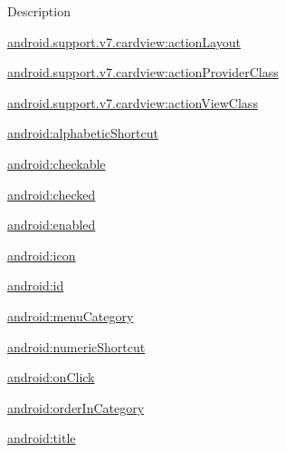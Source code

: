 Description 

{\ttfamily \hyperlink{classandroid_1_1support_1_1v7_1_1cardview_1_1R_1_1styleable_afc66347211033a94261991c2716632bc}{android.\+support.\+v7.\+cardview\+:action\+Layout}}

{\ttfamily \hyperlink{classandroid_1_1support_1_1v7_1_1cardview_1_1R_1_1styleable_a2fcf53a7e48550c4f268ac01853a1655}{android.\+support.\+v7.\+cardview\+:action\+Provider\+Class}}

{\ttfamily \hyperlink{classandroid_1_1support_1_1v7_1_1cardview_1_1R_1_1styleable_a68225a0f12a88cf1ba29787d1c3653f7}{android.\+support.\+v7.\+cardview\+:action\+View\+Class}}

{\ttfamily \hyperlink{classandroid_1_1support_1_1v7_1_1cardview_1_1R_1_1styleable_a0b91d93cd360e9465c306a85707eb4ac}{android\+:alphabetic\+Shortcut}}

{\ttfamily \hyperlink{classandroid_1_1support_1_1v7_1_1cardview_1_1R_1_1styleable_a1ab1fd5f17ea58611817a12d2ef3713b}{android\+:checkable}}

{\ttfamily \hyperlink{classandroid_1_1support_1_1v7_1_1cardview_1_1R_1_1styleable_a4ffc529c71f2f0638450bac64fa53cfc}{android\+:checked}}

{\ttfamily \hyperlink{classandroid_1_1support_1_1v7_1_1cardview_1_1R_1_1styleable_a74813299c9b7535e4ba2a80e13f710f1}{android\+:enabled}}

{\ttfamily \hyperlink{classandroid_1_1support_1_1v7_1_1cardview_1_1R_1_1styleable_a9a74a73962dfd31a08f9c5012b4a47ad}{android\+:icon}}

{\ttfamily \hyperlink{classandroid_1_1support_1_1v7_1_1cardview_1_1R_1_1styleable_aceedae784a2b71f1563676652a79235d}{android\+:id}}

{\ttfamily \hyperlink{classandroid_1_1support_1_1v7_1_1cardview_1_1R_1_1styleable_ab7b49f654f52bb18770eefb7401b05e6}{android\+:menu\+Category}}

{\ttfamily \hyperlink{classandroid_1_1support_1_1v7_1_1cardview_1_1R_1_1styleable_a52bacfc9a0dce455ac562b26db155cc4}{android\+:numeric\+Shortcut}}

{\ttfamily \hyperlink{classandroid_1_1support_1_1v7_1_1cardview_1_1R_1_1styleable_aa97c42d3174b202111467c1fe2920610}{android\+:on\+Click}}

{\ttfamily \hyperlink{classandroid_1_1support_1_1v7_1_1cardview_1_1R_1_1styleable_ada576758c86c3071f0ebb59174263f7f}{android\+:order\+In\+Category}}

{\ttfamily \hyperlink{classandroid_1_1support_1_1v7_1_1cardview_1_1R_1_1styleable_a36a1820cff371662c8af1f52b31283cc}{android\+:title}}


